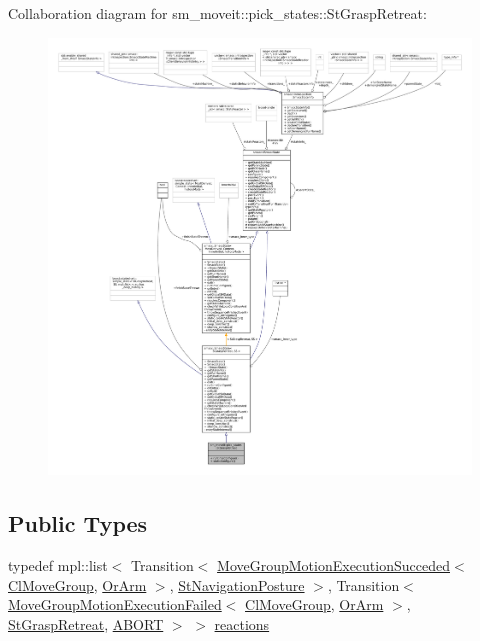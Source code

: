 Collaboration diagram for sm\+\_\+moveit\+:\+:pick\+\_\+states\+:\+:St\+Grasp\+Retreat\+:
\nopagebreak
\begin{figure}[H]
\begin{center}
\leavevmode
\includegraphics[width=350pt]{structsm__moveit_1_1pick__states_1_1StGraspRetreat__coll__graph}
\end{center}
\end{figure}
\subsection*{Public Types}
\begin{DoxyCompactItemize}
\item 
typedef mpl\+::list$<$ Transition$<$ \hyperlink{structmoveit__z__client_1_1MoveGroupMotionExecutionSucceded}{Move\+Group\+Motion\+Execution\+Succeded}$<$ \hyperlink{classmoveit__z__client_1_1ClMoveGroup}{Cl\+Move\+Group}, \hyperlink{classsm__moveit_1_1OrArm}{Or\+Arm} $>$, \hyperlink{structsm__moveit_1_1pick__states_1_1StNavigationPosture}{St\+Navigation\+Posture} $>$, Transition$<$ \hyperlink{structmoveit__z__client_1_1MoveGroupMotionExecutionFailed}{Move\+Group\+Motion\+Execution\+Failed}$<$ \hyperlink{classmoveit__z__client_1_1ClMoveGroup}{Cl\+Move\+Group}, \hyperlink{classsm__moveit_1_1OrArm}{Or\+Arm} $>$, \hyperlink{structsm__moveit_1_1pick__states_1_1StGraspRetreat}{St\+Grasp\+Retreat}, \hyperlink{classABORT}{A\+B\+O\+RT} $>$ $>$ \hyperlink{structsm__moveit_1_1pick__states_1_1StGraspRetreat_a8cb7952472046718830fb75585f0d11a}{reactions}
\end{DoxyCompactItemize}
